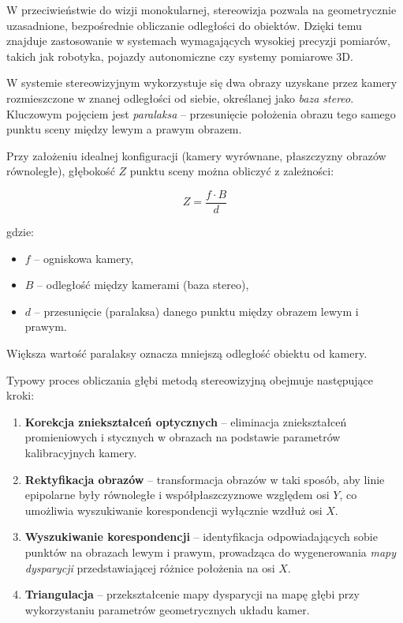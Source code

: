 \documentclass[magisterska]{pracadypl}
\begin{document}
W przeciwieństwie do wizji monokularnej, stereowizja pozwala na geometrycznie uzasadnione, bezpośrednie obliczanie odległości do obiektów. Dzięki temu znajduje zastosowanie w systemach wymagających wysokiej precyzji pomiarów, takich jak robotyka, pojazdy autonomiczne czy systemy pomiarowe 3D.

W systemie stereowizyjnym wykorzystuje się dwa obrazy uzyskane przez kamery rozmieszczone w znanej odległości od siebie, określanej jako \textit{baza stereo}. Kluczowym pojęciem jest \textit{paralaksa} – przesunięcie położenia obrazu tego samego punktu sceny między lewym a prawym obrazem.

Przy założeniu idealnej konfiguracji (kamery wyrównane, płaszczyzny obrazów równoległe), głębokość \(Z\) punktu sceny można obliczyć z zależności:

\[
Z = \frac{f \cdot B}{d}
\]

gdzie:
\begin{itemize}
    \item \(f\) – ogniskowa kamery,
    \item \(B\) – odległość między kamerami (baza stereo),
    \item \(d\) – przesunięcie (paralaksa) danego punktu między obrazem lewym i prawym.
\end{itemize}

Większa wartość paralaksy oznacza mniejszą odległość obiektu od kamery.

Typowy proces obliczania głębi metodą stereowizyjną obejmuje następujące kroki:

\begin{enumerate}
    \item \textbf{Korekcja zniekształceń optycznych} – eliminacja zniekształceń promieniowych i stycznych w obrazach na podstawie parametrów kalibracyjnych kamery.
    \item \textbf{Rektyfikacja obrazów} – transformacja obrazów w taki sposób, aby linie epipolarne były równoległe i współpłaszczyznowe względem osi \(Y\), co umożliwia wyszukiwanie korespondencji wyłącznie wzdłuż osi \(X\).
    \item \textbf{Wyszukiwanie korespondencji} – identyfikacja odpowiadających sobie punktów na obrazach lewym i prawym, prowadząca do wygenerowania \textit{mapy dysparycji} przedstawiającej różnice położenia na osi \(X\).
    \item \textbf{Triangulacja} – przekształcenie mapy dysparycji na mapę głębi przy wykorzystaniu parametrów geometrycznych układu kamer.
\end{enumerate}
\end{document}
